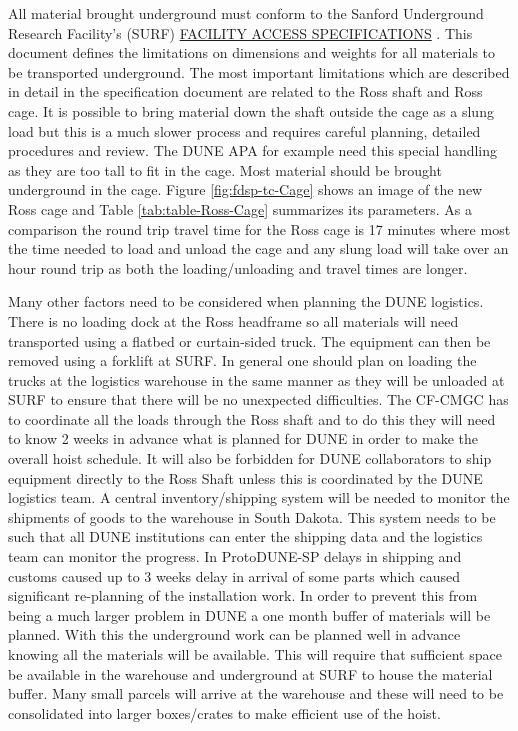 All material brought underground must conform to the Sanford Underground Research Facility's (SURF) \href{http://docs.dunescience.org/cgi-bin/ShowDocument?docid=328}{FACILITY ACCESS SPECIFICATIONS}\cite{bib:docdb328}
. This document defines the limitations on dimensions and weights for all materials to be transported underground.  The most important limitations which are described in detail in the specification document are related to the Ross shaft and Ross cage. It is possible to bring material down the shaft outside the cage as a slung load but this is a much slower process and requires careful planning, detailed procedures and review. The DUNE APA for example need this special handling as they are too tall to fit in the cage. Most material should be brought underground in the cage. Figure \ref{fig:fdsp-tc-Cage} shows an image of the new Ross cage and Table \ref{tab:table-Ross-Cage} summarizes its parameters. As a comparison the round trip travel time for the Ross cage is 17 minutes where most the time needed to load and unload the cage and any slung load will take over an hour round trip as both the loading/unloading and travel times are longer. 

Many other factors need to be considered when planning the DUNE logistics. There is no loading dock at the Ross headframe so all materials will need transported using a flatbed or curtain-sided truck. The equipment can then be removed using a forklift at SURF. In general one should plan on loading the trucks at the logistics warehouse in the same manner as they will be unloaded at SURF to ensure that there will be no unexpected difficulties. The CF-CMGC has to coordinate all the loads through the Ross shaft and to do this they will need to know 2 weeks in advance what is planned for DUNE in order to make the overall hoist schedule. It will also be forbidden for DUNE collaborators to ship equipment directly to the Ross Shaft unless this is coordinated by the DUNE logistics team. A central inventory/shipping system will be needed to monitor the shipments of goods to the warehouse in South Dakota. This system needs to be such that all DUNE institutions can enter the shipping data and the logistics team can monitor the progress. In ProtoDUNE-SP delays in shipping and customs caused up to 3 weeks delay in arrival of some parts which caused significant re-planning of the installation work. In order to prevent this from being a much larger problem in DUNE a one month buffer of materials will be planned. With this the underground work can be planned well in advance knowing all the materials will be available. This will require that sufficient space be available in the warehouse and underground at SURF to house the material buffer. Many small parcels will arrive at the warehouse and these will need to be consolidated into larger boxes/crates to make efficient use of the hoist. 




